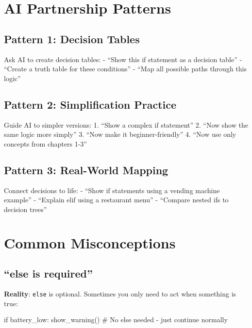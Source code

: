 \documentclass[
  letterpaper,
  DIV=11,
  numbers=noendperiod,
  oneside]{scrreprt}
\newenvironment{Shaded}{}{}
\newcommand{\CommentTok}[1]{\textcolor[rgb]{0.42,0.45,0.49}{#1}}
\newcommand{\ControlFlowTok}[1]{\textcolor[rgb]{0.84,0.23,0.29}{#1}}
\newcommand{\NormalTok}[1]{\textcolor[rgb]{0.14,0.16,0.18}{#1}}
\begin{document}
\section{AI Partnership Patterns}\label{ai-partnership-patterns-3}

\subsection{Pattern 1: Decision Tables}\label{pattern-1-decision-tables}

Ask AI to create decision tables: - ``Show this if statement as a
decision table'' - ``Create a truth table for these conditions'' - ``Map
all possible paths through this logic''

\subsection{Pattern 2: Simplification
Practice}\label{pattern-2-simplification-practice}

Guide AI to simpler versions: 1. ``Show a complex if statement'' 2.
``Now show the same logic more simply'' 3. ``Now make it
beginner-friendly'' 4. ``Now use only concepts from chapters 1-3''

\subsection{Pattern 3: Real-World
Mapping}\label{pattern-3-real-world-mapping}

Connect decisions to life: - ``Show if statements using a vending
machine example'' - ``Explain elif using a restaurant menu'' - ``Compare
nested ifs to decision trees''

\section{Common Misconceptions}\label{common-misconceptions-3}

\subsection{``else is required''}\label{else-is-required}

\textbf{Reality}: \texttt{else} is optional. Sometimes you only need to
act when something is true:

\begin{Shaded}
\begin{Highlighting}[]
\ControlFlowTok{if}\NormalTok{ battery\_low:}
\NormalTok{    show\_warning()}
\CommentTok{\# No else needed {-} just continue normally}
\end{Highlighting}
\end{Shaded}
\end{document}

